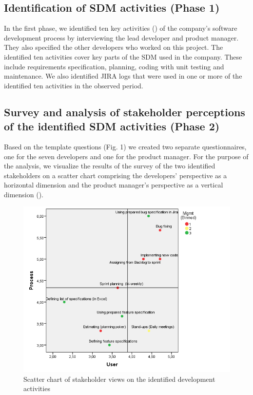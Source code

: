\subsection{Identification of SDM activities (Phase 1)}
In the first phase, we identified ten key activities () of the company’s software development process by interviewing the lead developer and product manager.  They also specified the other developers who worked on this project. The identified ten activities cover key parts of the SDM used in the company. These include requirements specification, planning, coding with unit testing and maintenance. We also identified JIRA logs that were used in one or more of the identified ten activities in the observed period.



\subsection{Survey and analysis of stakeholder perceptions of the identified SDM activities (Phase 2)}
\label{subsec:phase2}

Based on the template questions (Fig. 1) we created two separate questionnaires, one for the seven developers and one for the product manager. For the purpose of the analysis, we visualize the results of the survey of the two identified stakeholders on a scatter chart comprising the developers’ perspective as a horizontal dimension and the product manager’s perspective as a vertical dimension ().

\begin{figure}
	\centering
	\includegraphics[width=\linewidth]{figures/survey-scatter-plot}
	\caption{Scatter chart of stakeholder views on the identified development activities}
	\label{fig:survey-scatter-plot}
\end{figure}


